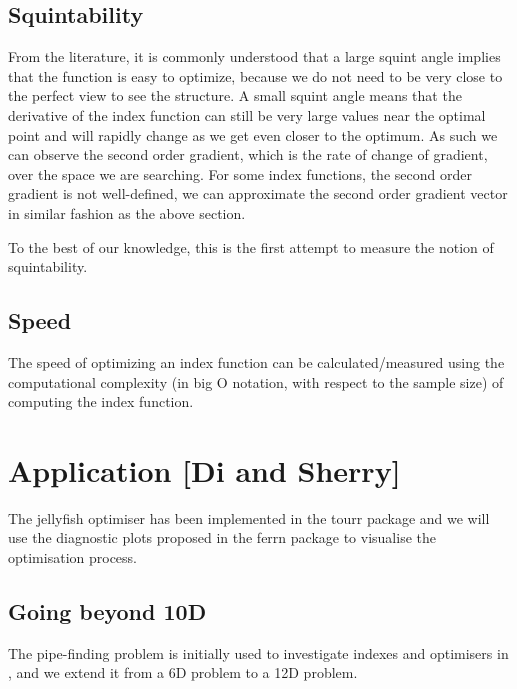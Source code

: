 \documentclass[
  number,
  preprint,
  3p]{elsarticle}
\begin{document}
\hypertarget{squintability}{%
\subsection{Squintability}\label{squintability}}

From the literature, it is commonly understood that a large squint angle
implies that the function is easy to optimize, because we do not need to
be very close to the perfect view to see the structure. A small squint
angle means that the derivative of the index function can still be very
large values near the optimal point and will rapidly change as we get
even closer to the optimum. As such we can observe the second order
gradient, which is the rate of change of gradient, over the space we are
searching. For some index functions, the second order gradient is not
well-defined, we can approximate the second order gradient vector in
similar fashion as the above section.

To the best of our knowledge, this is the first attempt to measure the
notion of squintability.

\hypertarget{speed}{%
\subsection{Speed}\label{speed}}

The speed of optimizing an index function can be calculated/measured
using the computational complexity (in big O notation, with respect to
the sample size) of computing the index function.

\hypertarget{sec-simulation}{%
\section{Application {[}Di and Sherry{]}}\label{sec-simulation}}

The jellyfish optimiser has been implemented in the tourr package
\citep{wickham_tourr_2011} and we will use the diagnostic plots proposed
in the ferrn package \citep{RJ-2021-105} to visualise the optimisation
process.

\hypertarget{going-beyond-10d}{%
\subsection{Going beyond 10D}\label{going-beyond-10d}}

The pipe-finding problem is initially used to investigate indexes and
optimisers in \citet{laa_using_2020}, and we extend it from a 6D problem
to a 12D problem.
\end{document}
